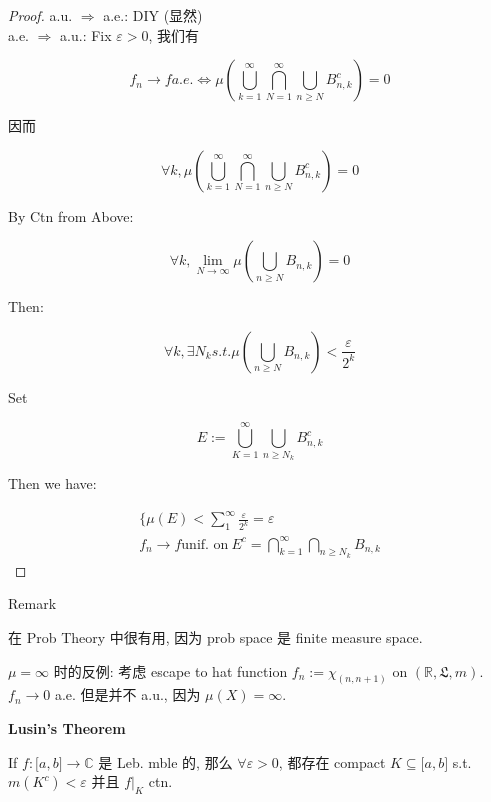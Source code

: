 \documentclass{qlnotes-export}
\begin{document}
\begin{proof}

a.u. \(\Longrightarrow\) a.e.: DIY (显然)\\
a.e. \(\Longrightarrow\) a.u.: Fix \(\varepsilon > 0\), 我们有

\[f_{n}\rightarrow f a.e.\Leftrightarrow\mu(\bigcup\limits_{k = 1}^{\infty}\bigcap\limits_{N = 1}^{\infty}\bigcup\limits_{n \geq N}B_{n,k}^{c}) = 0\]

因而

\[\forall k,\mu(\bigcup\limits_{k = 1}^{\infty}\bigcap\limits_{N = 1}^{\infty}\bigcup\limits_{n \geq N}B_{n,k}^{c}) = 0\]

By Ctn from Above:

\[\forall k,\lim\limits_{N\rightarrow\infty}\mu(\bigcup\limits_{n \geq N}B_{n,k}) = 0\]

Then:

\[\forall k,\exists N_{k} s.t.\mu(\bigcup\limits_{n \geq N}B_{n,k}) < \frac{\varepsilon}{2^{k}}\]

Set

\[E := \bigcup\limits_{K = 1}^{\infty}\bigcup\limits_{n \geq N_{k}}B_{n,k}^{c}\]

Then we have:

\[\begin{matrix}
{\{\mu(E) < \sum\limits_{1}^{\infty}\frac{\varepsilon}{2^{k}} = \varepsilon} \\
{f_{n}\rightarrow f\text{unif. on}\ E^{c} = \bigcap\limits_{k = 1}^{\infty}\bigcap\limits_{n \geq N_{k}}B_{n,k}}
\end{matrix}\]

\end{proof}

\begin{qlremark}{Remark}

在 Prob Theory 中很有用, 因为 prob space 是 finite measure space.

\end{qlremark}

\begin{example}

\(\mu = \infty\) 时的反例: 考虑 escape to hat function \(f_{n} := \chi_{(n,n + 1)}\) on \(({\mathbb{R}},{\mathfrak{L}},m)\).\\
\(f_{n}\rightarrow 0\) a.e. 但是并不 a.u., 因为 \(\mu(X) = \infty\).

\end{example}

\begin{theorem}{\protect{}\label{kn-lusin-s-theorem}{\textbf{Lusin's
Theorem}}}

If \(f:\lbrack a,b\rbrack\rightarrow{\mathbb{C}}\) 是 Leb. mble 的, 那么 \(\forall\varepsilon > 0\), 都存在 compact \(K \subseteq \lbrack a,b\rbrack\) s.t. \(m(K^{c}) < \varepsilon\) 并且 \(f|_{K}\) ctn.

\end{theorem}
\end{document}
